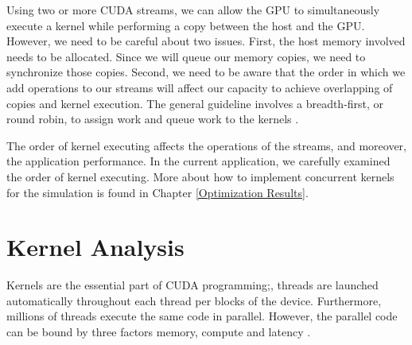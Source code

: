 Using two or more CUDA streams, we can allow the GPU to simultaneously execute a kernel while performing a copy between the host and the GPU. However, we need to be careful about two issues. First, the host memory involved needs to be allocated. Since we will queue our memory copies, we need to synchronize those copies. Second, we need to be aware that the order in which we add operations to our streams will affect our capacity to achieve overlapping of copies and kernel execution. The general guideline involves a breadth-first, or round robin, to assign work and queue work to the kernels \cite{example}.

The order of kernel executing affects the operations of the streams, and moreover, the application performance. In the current application, we carefully examined the order of kernel executing. More about how to implement concurrent kernels for the simulation is found in Chapter \ref{Optimization Results}.

\section{Kernel Analysis}

 Kernels are the essential part of CUDA programming;, threads are launched automatically throughout each thread per blocks of the device. Furthermore, millions of threads execute the same code in parallel. However, the parallel code can be bound by three factors memory, compute and latency \cite{cook}.

